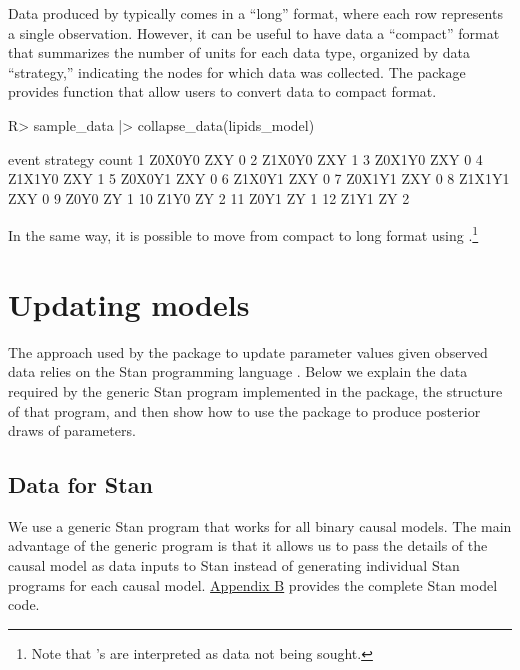 \documentclass[
  11pt,
  article]{jss}
\renewcommand{\texttt}[1]{\code{#1}}
\begin{document}
Data produced by \texttt{make\_data()} typically comes in a ``long''
format, where each row represents a single observation. However, it can
be useful to have data a ``compact'' format that summarizes the number
of units for each data type, organized by data ``strategy,'' indicating
the nodes for which data was collected. The  package
provides function \texttt{collapse\_data()} that allow users to convert
data to compact format.

\begin{CodeChunk}
\begin{CodeInput}
R> sample_data |> collapse_data(lipids_model)
\end{CodeInput}

\begin{CodeOutput}
    event strategy count
1  Z0X0Y0      ZXY     0
2  Z1X0Y0      ZXY     1
3  Z0X1Y0      ZXY     0
4  Z1X1Y0      ZXY     1
5  Z0X0Y1      ZXY     0
6  Z1X0Y1      ZXY     0
7  Z0X1Y1      ZXY     0
8  Z1X1Y1      ZXY     0
9    Z0Y0       ZY     1
10   Z1Y0       ZY     2
11   Z0Y1       ZY     1
12   Z1Y1       ZY     2
\end{CodeOutput}
\end{CodeChunk}

In the same way, it is possible to move from compact to long format
using \texttt{expand\_data()}.\footnote{Note that \texttt{NA}'s are
  interpreted as data not being sought.}

\section{Updating models}\label{sec-update}

The approach used by the  package to update parameter
values given observed data relies on the Stan programming language
\citep{carpenter_stan_2017}. Below we explain the data required by the
generic Stan program implemented in the package, the structure of that
program, and then show how to use the package to produce posterior draws
of parameters.

\subsection{Data for Stan}\label{data-for-stan}

We use a generic Stan program that works for all binary causal models.
The main advantage of the generic program is that it allows us to pass
the details of the causal model as data inputs to Stan instead of
generating individual Stan programs for each causal model.
\hyperref[sec-stancode]{Appendix B} provides the complete Stan model
code.
\end{document}

